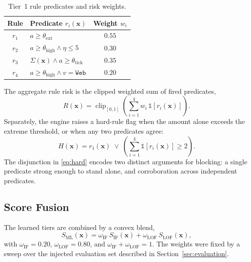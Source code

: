 \documentclass[conference]{IEEEtran}
\begin{document}
\begin{table}[t]
\centering
\caption{Tier~1 rule predicates and risk weights.}
\label{tab:rules}
\renewcommand{\arraystretch}{1.25}
\begin{tabular}{@{}clc@{}}
\toprule
\textbf{Rule} & \textbf{Predicate $r_{i}(\mathbf{x})$} & \textbf{Weight $w_{i}$} \\
\midrule
$r_{1}$ & $a \geq \theta_{\mathrm{ext}}$                                & $0.55$ \\
$r_{2}$ & $a \geq \theta_{\mathrm{high}} \wedge \eta \leq 5$            & $0.30$ \\
$r_{3}$ & $\Sigma(\mathbf{x}) \wedge a \geq \theta_{\mathrm{tick}}$     & $0.35$ \\
$r_{4}$ & $a \geq \theta_{\mathrm{high}} \wedge v = \texttt{Web}$       & $0.20$ \\
\bottomrule
\end{tabular}
\end{table}

The aggregate rule risk is the clipped weighted sum of fired
predicates,
\begin{equation}
R(\mathbf{x}) = \operatorname{clip}_{[0,1]}
\left(\sum_{i=1}^{4} w_{i}\, \mathbb{1}\!\left[r_{i}(\mathbf{x})\right]\right).
\label{eq:rulerisk}
\end{equation}
Separately, the engine raises a hard-rule flag when the amount alone
exceeds the extreme threshold, or when any two predicates agree:
\begin{equation}
H(\mathbf{x}) =
r_{1}(\mathbf{x})
\;\vee\;
\left(
\sum_{i=1}^{4}\mathbb{1}\!\left[r_{i}(\mathbf{x})\right] \geq 2
\right).
\label{eq:hard}
\end{equation}
The disjunction in \eqref{eq:hard} encodes two distinct arguments for
blocking: a single predicate strong enough to stand alone, and
corroboration across independent predicates.

\subsection{Score Fusion}
\label{subsec:fusion}

The learned tiers are combined by a convex blend,
\begin{equation}
S_{\mathrm{ML}}(\mathbf{x}) =
\omega_{\mathrm{IF}}\, S_{\mathrm{IF}}(\mathbf{x})
+ \omega_{\mathrm{LOF}}\, S_{\mathrm{LOF}}(\mathbf{x}),
\label{eq:ml}
\end{equation}
with $\omega_{\mathrm{IF}} = 0.20$, $\omega_{\mathrm{LOF}} = 0.80$, and
$\omega_{\mathrm{IF}} + \omega_{\mathrm{LOF}} = 1$. The weights were
fixed by a sweep over the injected evaluation set described in
Section~\ref{sec:evaluation}.
\end{document}
